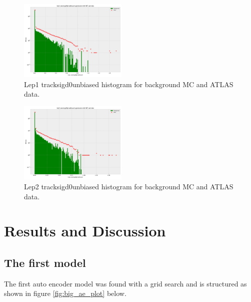 \documentclass[ reprint, amsmath,amssymb, aps, nofootinbib]{revtex4-2}
\begin{document}
\begin{figure}[H]
    \centering
    \includegraphics[width=0.46\textwidth]{figures/implementation/lep1_tracksigd0pvunbiased.pdf}
    \caption{Lep1 tracksigd0unbiased histogram for background MC and ATLAS data. }
    \label{fig:lep1sigd0}
\end{figure}

\begin{figure}[H]
    \centering
    \includegraphics[width=0.46\textwidth]{figures/implementation/lep2_tracksigd0pvunbiased.pdf}
    \caption{Lep2 tracksigd0unbiased histogram for background MC and ATLAS data.}
    \label{fig:lep2sigd0}
\end{figure}


\section{Results and Discussion}

\subsection{The first model}

The first auto encoder model was found with a grid search and is structured as shown in figure \ref{fig:big_ae_plot} below. 
\end{document}
